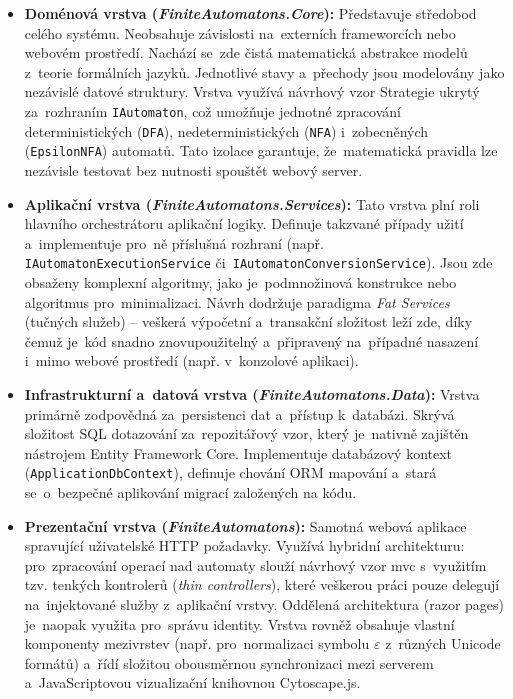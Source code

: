 \documentclass[
  master,
  program=ainfvs,
  printversion,
  figures=false,
  tables=false,
  glossaries,
  index
]{kidiplom}
\begin{document}
\begin{itemize}
    \item \textbf{Doménová vrstva (\textit{FiniteAutomatons.Core}):} 
    Představuje středobod celého systému. Neobsahuje závislosti na~externích frameworcích nebo webovém prostředí. Nachází se~zde čistá matematická abstrakce modelů z~teorie formálních jazyků. Jednotlivé stavy a~přechody jsou modelovány jako nezávislé datové struktury. Vrstva využívá návrhový vzor Strategie ukrytý za~rozhraním \texttt{IAutomaton}, což umožňuje jednotné zpracování deterministických (\texttt{DFA}), nedeterministických (\texttt{NFA}) i~zobecněných (\texttt{EpsilonNFA}) automatů. Tato izolace garantuje, že~matematická pravidla lze nezávisle testovat bez nutnosti spouštět webový server.

    \item \textbf{Aplikační vrstva (\textit{FiniteAutomatons.Services}):} 
    Tato vrstva plní roli hlavního orchestrátoru aplikační logiky. Definuje takzvané případy užití a~implementuje pro~ně příslušná rozhraní (např. \texttt{IAutomaton\-Exe\-cu\-tion\-Service} či~\texttt{IAutomaton\-Conversion\-Service}). Jsou zde obsaženy komplexní algoritmy, jako je~podmnožinová konstrukce nebo algoritmus pro~minimalizaci. Návrh dodržuje paradigma \textit{Fat Services} (tučných služeb) – veškerá výpočetní a~transakční složitost leží zde, díky čemuž je~kód snadno znovupoužitelný a~připravený na~případné nasazení i~mimo webové prostředí (např. v~konzolové aplikaci).
    
    \item \textbf{Infrastrukturní a~datová vrstva (\textit{FiniteAutomatons.Data}):} 
    Vrstva primárně zodpovědná za~persistenci dat a~přístup k~databázi. Skrývá složitost SQL dotazování za~repozitářový vzor, který je~nativně zajištěn nástrojem Entity Framework Core. Implementuje databázový kontext (\texttt{App\-li\-ca\-tion\-Db\-Context}), definuje chování ORM mapování a~stará se~o~bezpečné aplikování migrací založených na kódu. 
    
    \item \textbf{Prezentační vrstva (\textit{FiniteAutomatons}):} 
    Samotná webová aplikace spravující uživatelské HTTP požadavky. Využívá hybridní architekturu: pro~zpracování operací nad automaty slouží návrhový vzor \gls{mvc} s~využitím tzv. tenkých kontrolerů (\textit{thin controllers}), které veškerou práci pouze delegují na~injektované služby z~aplikační vrstvy. Oddělená architektura (razor pages) je~naopak využita pro~správu identity. Vrstva rovněž obsahuje vlastní komponenty mezivrstev (např. pro~normalizaci symbolu $\varepsilon$ z~různých Unicode formátů) a~řídí složitou obousměrnou synchronizaci mezi serverem a~JavaScriptovou vizualizační knihovnou Cytoscape.js.
\end{itemize}
\end{document}
